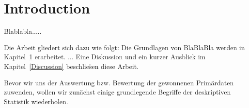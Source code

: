 
\chapter{Introduction}\label{Introduction}

Blablabla.....

\medskip
Die Arbeit gliedert sich dazu wie folgt: Die Grundlagen von BlaBlaBla 
werden in Kapitel~\ref{Introduction} erarbeitet. 
...
Eine
Diskussion und ein kurzer Ausblick im
Kapitel~\ref{Discussion} beschlie\"sen diese Arbeit.

Bevor wir uns der Auswertung bzw. Bewertung der gewonnenen Prim\"ardaten zuwenden, wollen wir zun\"achst einige grundlegende Begriffe der deskriptiven Statistik wiederholen.

